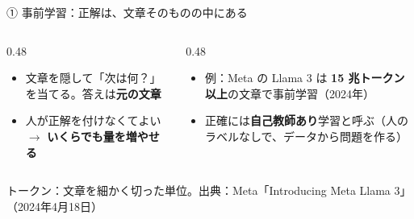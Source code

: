 \documentclass[aspectratio=169]{beamer}
\begin{document}
\begin{frame}{① 事前学習：正解は、文章そのものの中にある}
\begin{center}
\end{center}
\vspace{0.4em}
\begin{columns}[t]
\begin{column}{0.48\textwidth}
\begin{itemize}\small
  \item 文章を隠して「次は何？」を当てる。答えは\textbf{元の文章}
  \item 人が正解を付けなくてよい $\rightarrow$ \textbf{いくらでも量を増やせる}
\end{itemize}
\end{column}
\begin{column}{0.48\textwidth}
\begin{itemize}\small
  \item 例：Meta の Llama 3 は \textbf{15 兆トークン以上}の文章で事前学習（2024年）
  \item 正確には\textbf{自己教師あり}学習と呼ぶ（人のラベルなしで、データから問題を作る）
\end{itemize}
\end{column}
\end{columns}
\vspace{0.3em}
{\scriptsize トークン：文章を細かく切った単位。出典：Meta「Introducing Meta Llama 3」（2024年4月18日）}
\end{frame}
\end{document}
